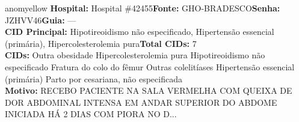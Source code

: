 \documentclass[a4paper,10pt]{article}
\begin{document}
\begin{anomalycard}[Interna\c{c}\~{a}o \#118038 | Pac. \#60346 | MODERADO (z=2.17) | LOS: 3d | 22/02/2026\,$\to$\,25/02/2026]{anomyellow}
\textbf{Hospital:} Hospital \#42455\quad \textbf{Fonte:} GHO-BRADESCO\quad \textbf{Senha:} JZHVV46\quad \textbf{Guia:} ---\\

\textbf{CID Principal:} {\small Hipotireoidismo não especificado, Hipertensão essencial (primária), Hipercolesterolemia pura}\quad\textbf{Total CIDs:} 7\\

\textbf{CIDs:} {\scriptsize Outra obesidade \textbar{} Hipercolesterolemia pura \textbar{} Hipotireoidismo não especificado \textbar{} Fratura do colo do fêmur \textbar{} Outras colelitíases \textbar{} Hipertensão essencial (primária) \textbar{} Parto por cesariana, não especificada}\\

\textbf{Motivo:} {\scriptsize RECEBO PACIENTE NA SALA VERMELHA COM QUEIXA DE DOR ABDOMINAL INTENSA EM ANDAR SUPERIOR DO ABDOME INICIADA HÁ 2 DIAS COM PIORA NO D...}\\



\end{anomalycard}
\end{document}
